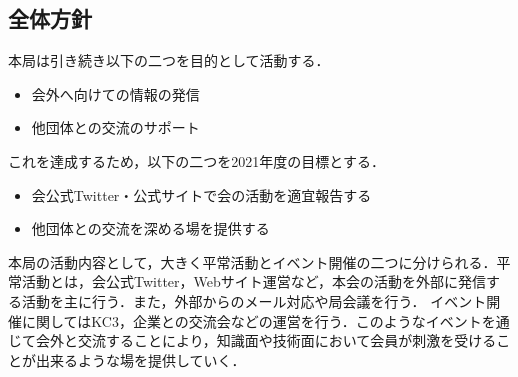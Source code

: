 \subsection*{全体方針}

本局は引き続き以下の二つを目的として活動する．
\begin{itemize}
    \item 会外へ向けての情報の発信
    \item 他団体との交流のサポート
\end{itemize}
これを達成するため，以下の二つを2021年度の目標とする．
\begin{itemize}
  \item 会公式Twitter・公式サイトで会の活動を適宜報告する
  \item 他団体との交流を深める場を提供する
\end{itemize}
本局の活動内容として，大きく平常活動とイベント開催の二つに分けられる．平常活動とは，会公式Twitter，Webサイト運営など，本会の活動を外部に発信する活動を主に行う．また，外部からのメール対応や局会議を行う．
イベント開催に関してはKC3，企業との交流会などの運営を行う．このようなイベントを通じて会外と交流することにより，知識面や技術面において会員が刺激を受けることが出来るような場を提供していく．
